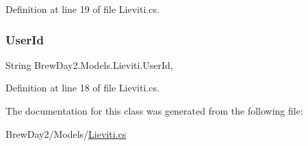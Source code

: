 Definition at line 19 of file Lieviti.\+cs.

\mbox{\label{class_brew_day2_1_1_models_1_1_lieviti_aaa6ddde2c056933f9e6a4ea7323416fe}} 
\subsubsection{\texorpdfstring{User\+Id}{UserId}}
{\footnotesize\ttfamily String Brew\+Day2.\+Models.\+Lieviti.\+User\+Id\hspace{0.3cm}{\ttfamily [get]}, {\ttfamily [set]}}



Definition at line 18 of file Lieviti.\+cs.



The documentation for this class was generated from the following file\+:\begin{DoxyCompactItemize}
\item 
Brew\+Day2/\+Models/\mbox{\hyperlink{_lieviti_8cs}{Lieviti.\+cs}}\end{DoxyCompactItemize}
